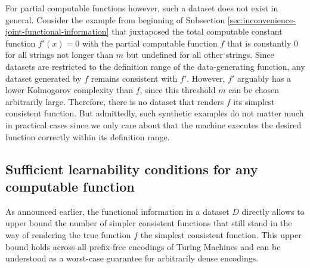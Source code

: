 For partial computable functions however, such a dataset does not exist in general.
Consider the example from beginning of Subsection \ref{sec:inconvenience-joint-functional-information} that juxtaposed the total computable constant function $f'(x)=0$ with the partial computable function $f$ that is constantly $0$ for all strings not longer than $m$ but undefined for all other strings.
Since datasets are restricted to the definition range of the data-generating function, any dataset generated by $f$ remains consistent with $f'$.
However, $f'$ arguably has a lower Kolmogorov complexity than $f$, since this threshold $m$ can be chosen arbitrarily large.
Therefore, there is no dataset that renders $f$ its simplest consistent function.
But admittedly, such synthetic examples do not matter much in practical cases since we only care about that the machine executes the desired function correctly within its definition range.

\subsection{Sufficient learnability conditions for any computable function}
As announced earlier, the functional information in a dataset $D$ directly allows to upper bound the number of simpler consistent functions that still stand in the way of rendering the true function $f$ the simplest consistent function. 
This upper bound holds across all prefix-free encodings of Turing Machines and can be understood as a worst-case guarantee for arbitrarily dense encodings.

